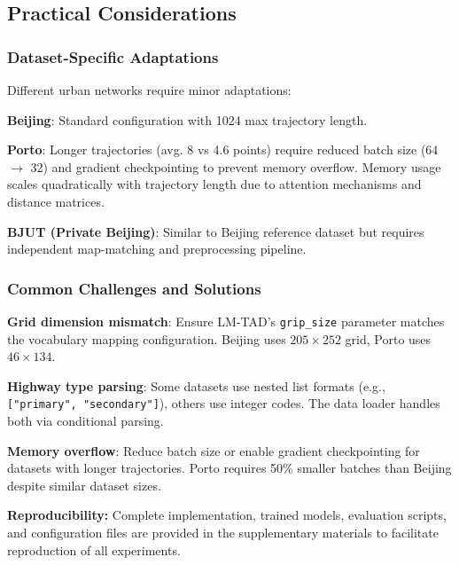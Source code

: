 \subsection{Practical Considerations}
\label{sec:impl-practical}

\subsubsection{Dataset-Specific Adaptations}

Different urban networks require minor adaptations:

\textbf{Beijing}: Standard configuration with 1024 max trajectory length.

\textbf{Porto}: Longer trajectories (avg. 8 vs 4.6 points) require reduced batch size (64 $\rightarrow$ 32) and gradient checkpointing to prevent memory overflow. Memory usage scales quadratically with trajectory length due to attention mechanisms and distance matrices.

\textbf{BJUT (Private Beijing)}: Similar to Beijing reference dataset but requires independent map-matching and preprocessing pipeline.

\subsubsection{Common Challenges and Solutions}

\textbf{Grid dimension mismatch}: Ensure LM-TAD's \texttt{grip\_size} parameter matches the vocabulary mapping configuration. Beijing uses $205 \times 252$ grid, Porto uses $46 \times 134$.

\textbf{Highway type parsing}: Some datasets use nested list formats (e.g., \texttt{["primary", "secondary"]}), others use integer codes. The data loader handles both via conditional parsing.

\textbf{Memory overflow}: Reduce batch size or enable gradient checkpointing for datasets with longer trajectories. Porto requires 50\% smaller batches than Beijing despite similar dataset sizes.

\textbf{Reproducibility:} Complete implementation, trained models, evaluation scripts, and configuration files are provided in the supplementary materials to facilitate reproduction of all experiments.

